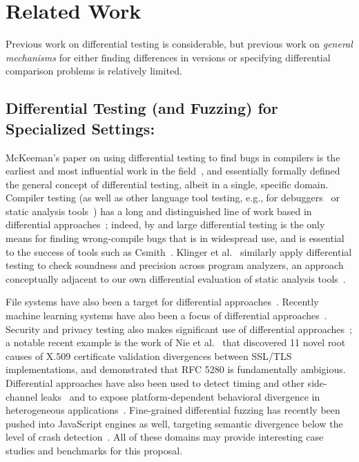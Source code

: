 \section{Related Work}

Previous work on differential testing is considerable, but previous
work on \emph{general mechanisms} for either finding differences in versions
or specifying differential comparison problems is relatively limited.

\subsection{Differential Testing (and Fuzzing) for Specialized Settings:}
McKeeman's paper on using differential testing to find bugs in
compilers is the earliest and most influential work in the
field~\cite{Differential}, and essentially formally defined the
general concept of differential testing, albeit in a single, specific domain.  Compiler testing (as well as other
language tool testing, e.g., for debuggers~\cite{lehmann2018feedback}
or static analysis tools~\cite{StaticDiff}) has a long and
distinguished line of work based in differential
approaches~\cite{barany2018finding,chen2019deep,chen2016coverage};
indeed, by and large differential testing is the only means for
finding wrong-compile bugs that is in widespread use, and is essential
to the success of tools such as Csmith~\cite{csmith}.  Klinger et al.~\cite{klinger2019differentially} similarly apply differential testing to check soundness and precision across program analyzers, an approach conceptually adjacent to our own differential evaluation of static analysis tools~\cite{StaticDiff}.

File systems
have also been a target for differential approaches~\cite{ICSEDiff}.
Recently machine learning systems have also been a focus of
differential
approaches~\cite{herbold2023differential,li2026enhancing}.  Security
and privacy testing also makes significant use of differential
approaches~\cite{jung2008privacy,chen2015guided}; a notable recent
example is the work of Nie et al.~\cite{nie2023coverage} that
discovered 11 novel root causes of X.509 certificate validation
divergences between SSL/TLS implementations, and demonstrated that RFC
5280 is fundamentally ambigious.  Differential approaches have also
been used to detect timing and other side-channel
leaks~\cite{nilizadeh2019diffuzz} and to expose platform-dependent
behavioral divergence in heterogeneous
applications~\cite{zhang2021heterofuzz}. Fine-grained differential
fuzzing has recently been pushed into JavaScript engines as well,
targeting semantic divergence below the level of crash
detection~\cite{wachter2025dumpling}.  All of these domains may
provide interesting case studies and benchmarks for this proposal.

